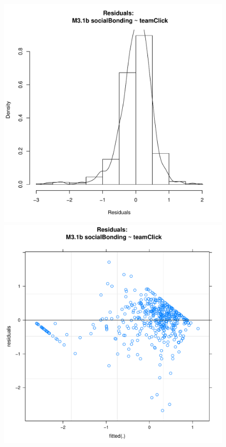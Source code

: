 \documentclass[12pt]{report}
\begin{document}
{\begin{figure}[htbp]
  \includegraphics[scale =.4]{../images/MLM31bHist.pdf}
  \includegraphics[scale =.4]{../images/MLM31bScatter.pdf}

\end{figure}}
\end{document}
